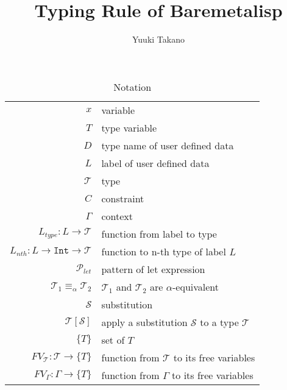 \documentclass{article}
\title{Typing Rule of Baremetalisp}
\author{Yuuki Takano}
\begin{document}
\maketitle

\begin{table}[tb]
\caption{Notation}
    \centering
    \begin{tabular}{rl}
        $x$ & variable \\
        $T$ & type variable \\
        $D$ & type name of user defined data \\
        $L$ & label of user defined data \\
        $\mathcal{T}$ & type \\
        $C$ & constraint \\
        $\Gamma$ & context \\
        $L_{type} : L \rightarrow \mathcal{T}$ & function from label to type \\
        $L_{nth} : L \rightarrow \mathtt{Int} \rightarrow \mathcal{T}$ & function to n-th type of label $L$ \\
        $\mathcal{P}_{let}$ & pattern of let expression \\
        $\mathcal{T}_1 \equiv_\alpha \mathcal{T}_2$ & $\mathcal{T}_1$ and $\mathcal{T}_2$ are $\alpha$-equivalent \\
        $\mathcal{S}$ & substitution \\
        $\mathcal{T}[\mathcal{S}]$ & apply a substitution $\mathcal{S}$ to a type $\mathcal{T}$ \\
        $\{T\}$ & set of $T$ \\
        $FV_\mathcal{T} : \mathcal{T} \rightarrow \{T\}$ & function from $\mathcal{T}$ to its free variables\\
        $FV_\Gamma : \Gamma \rightarrow \{T\}$ & function from $\Gamma$ to its free variables\\
    \end{tabular}
\end{table}
\end{document}
